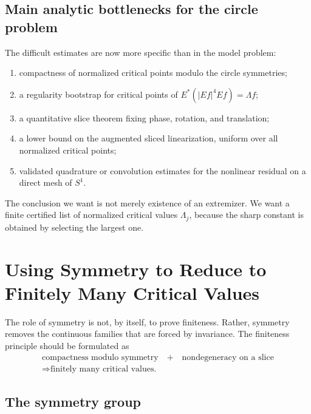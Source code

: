 \documentclass[12pt]{article}
\begin{document}
\subsection{Main analytic bottlenecks for the circle problem}

The difficult estimates are now more specific than in the model problem:
\begin{enumerate}[leftmargin=2em]
  \item compactness of normalized critical points modulo the circle symmetries;
  \item a regularity bootstrap for critical points of
    $E^*(|Ef|^4Ef)=\Lambda f$;
  \item a quantitative slice theorem fixing phase, rotation, and translation;
  \item a lower bound on the augmented sliced linearization, uniform over all
    normalized critical points;
  \item validated quadrature or convolution estimates for the nonlinear
    residual on a direct mesh of $S^1$.
\end{enumerate}

The conclusion we want is not merely existence of an extremizer. We want a
finite certified list of normalized critical values $\Lambda_j$, because the
sharp constant is obtained by selecting the largest one.

\section{Using Symmetry to Reduce to Finitely Many Critical Values}

The role of symmetry is not, by itself, to prove finiteness. Rather, symmetry
removes the continuous families that are forced by invariance. The finiteness
principle should be formulated as
\[
  \begin{gathered}
  \text{compactness modulo symmetry}
  \quad+\quad
  \text{nondegeneracy on a slice}\\
  \Longrightarrow
  \text{finitely many critical values.}
  \end{gathered}
\]

\subsection{The symmetry group}
\end{document}
